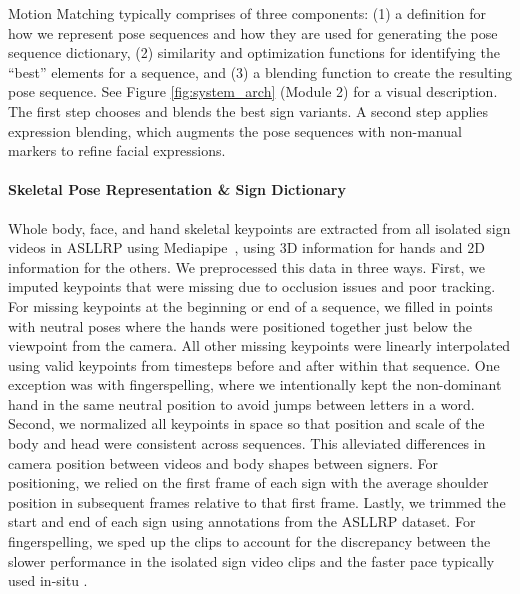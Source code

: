 Motion Matching typically comprises of three components: (1) a definition for how we represent pose sequences and how they are used for generating the pose sequence dictionary, (2) similarity and optimization functions for identifying the ``best'' elements for a sequence, and (3) a blending function to create the resulting pose sequence. 
See Figure \ref{fig:system_arch} (Module 2) for a visual description. The first step chooses and blends the best sign variants. A second step applies expression blending, which augments the pose sequences with non-manual markers to refine facial expressions. 

\paragraph{Skeletal Pose Representation \& Sign Dictionary}
Whole body, face, and hand skeletal keypoints are extracted from all isolated sign videos in ASLLRP using Mediapipe~\cite{lugaresi2019mediapipe}, using 3D information for hands and 2D information for the others.
We preprocessed this data in three ways. First, we imputed keypoints that were missing due to occlusion issues and poor tracking. For missing keypoints at the beginning or end of a sequence, we filled in points with neutral poses where the hands were positioned together just below the viewpoint from the camera. All other missing keypoints were linearly interpolated using valid keypoints from timesteps before and after within that sequence. One exception was with fingerspelling, where we intentionally kept the non-dominant hand in the same neutral position to avoid jumps between letters in a word. Second, we normalized all keypoints in space so that position and scale of the body and head were consistent across sequences. This alleviated differences in camera position between videos and body shapes between signers. For positioning, we relied on the first frame of each sign with the average shoulder position in subsequent frames relative to that first frame. Lastly, we trimmed the start and end of each sign using annotations from the ASLLRP dataset. For fingerspelling, we sped up the clips to account for the discrepancy between the slower performance in the isolated sign video clips and the faster pace typically used in-situ \cite{quinto2010rates}. 

